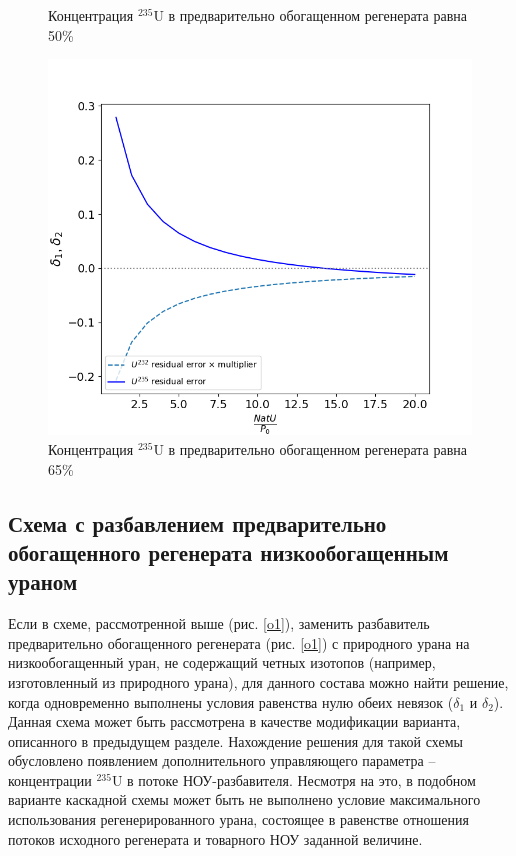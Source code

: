\begin{figure}[ht]
\begin{minipage}{.5\textwidth}
    \caption{Концентрация $^{235}$U в предварительно обогащенном регенерата равна 50\%}
    \label{delta3}
  \end{minipage}
  \begin{minipage}{.5\textwidth}
    \centering
    \includegraphics[width=.8\linewidth]{images/plots/65}  
    \caption{Концентрация $^{235}$U в предварительно обогащенном регенерата равна 65\%}
    \label{delta4}
  \end{minipage}
 \end{figure}


\subsection{Схема с разбавлением предварительно обогащенного регенерата низкообогащенным ураном}

Если в схеме, рассмотренной выше (рис. \ref{o1}), заменить разбавитель предварительно обогащенного регенерата (рис. \ref{o1}) с природного урана на низкообогащенный уран, не содержащий четных изотопов (например, изготовленный из природного урана), для данного состава можно найти решение, когда одновременно выполнены условия равенства нулю обеих невязок ($\delta_1$ и $\delta_2$). Данная схема может быть рассмотрена в качестве модификации варианта, описанного в предыдущем разделе. Нахождение решения для такой схемы обусловлено появлением дополнительного управляющего параметра -- концентрации $^{235}$U в потоке НОУ-разбавителя.  Несмотря на это, в подобном варианте каскадной схемы может быть не выполнено условие максимального использования регенерированного урана, состоящее в равенстве отношения потоков исходного регенерата и товарного НОУ заданной величине.


